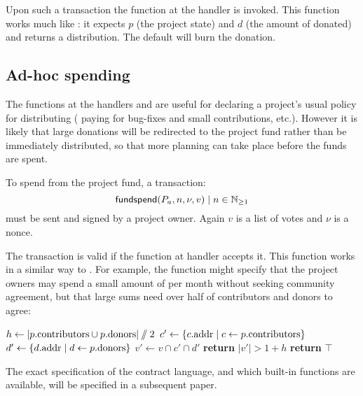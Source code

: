 Upon such a transaction the function at the  handler is
invoked. This function works much like : it expects $p$
(the project state) and $d$ (the amount of \oscoin{} donated) and returns a
distribution. The default will burn the donation.

\subsection{Ad-hoc spending}

The functions at the handlers  and 
are useful for declaring a project's usual policy for distributing \oscoin{}
(\eg{} paying for bug-fixes and small contributions, etc.). However it is likely
that large donations will be redirected to the project fund rather than be
immediately distributed, so that more planning can take place before the funds
are spent.

To spend \oscoin{} from the project fund, a transaction:
\[
    \mathsf{fundspend}\lparen P_a, n, \nu, v\rparen \mid n \in \mathbb{N}_{\geq 1}
\]
must be sent and signed by a project owner. Again $v$ is a list of votes and
$\nu$ is a nonce.

The transaction is valid if the function at handler  accepts
it. This function works in a similar way to . For
example, the function might specify that the project owners may spend a small
amount of \oscoin{} per month without seeking community agreement, but that
large sums need over half of contributors and donors to agree:
\medskip
\begin{algorithmic}[0]
            \State $h \gets |p.{\mathrm{contributors}} \cup p.{\mathrm{donors}}| \sslash 2$
            \State $c' \gets \{ c.{\mathrm{addr}} \mid c \gets p.{\mathrm{contributors}} \}$
            \State $d' \gets \{ d.{\mathrm{addr}} \mid d \gets p.{\mathrm{donors}} \}$
            \State $v' \gets v \cap c' \cap d'$
            \State \textbf{return} $|v'| > 1 + h$
            \Else
            \State \textbf{return} $\top$
        \EndIf
    \EndProcedure
\end{algorithmic}

The exact specification of the contract language, and which built-in functions
are available, will be specified in a subsequent paper.
